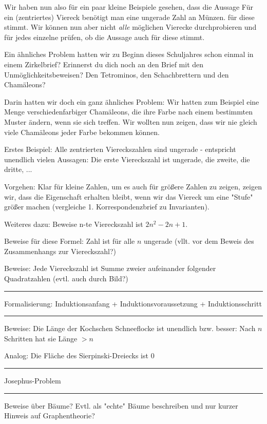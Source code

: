 \documentclass[a4paper,ngerman,12pt]{scrartcl}
\theoremstyle{definition}
\theoremstyle{plain}
\theoremstyle{remark}
\begin{document}
Wir haben nun also für ein paar kleine Beispiele gesehen, dass die Aussage \glqq Für ein (zentriertes) Viereck benötigt man eine ungerade Zahl an Münzen.\grqq{} für diese stimmt. Wir können nun aber nicht \emph{alle} möglichen Vierecke durchprobieren und für jedes einzelne prüfen, ob die Aussage auch für diese stimmt.

Ein ähnliches Problem hatten wir zu Beginn dieses Schuljahres schon einmal in einem Zirkelbrief? Erinnerst du dich noch an den Brief mit den Unmöglichkeitsbeweisen? Den Tetrominos, den Schachbrettern und den Chamäleons? 


Darin hatten wir doch ein ganz ähnliches Problem: Wir hatten zum Beispiel eine Menge verschiedenfarbiger Chamäleons, die ihre Farbe nach einem bestimmten Muster ändern, wenn sie sich treffen. Wir wollten nun zeigen, dass wir nie gleich viele Chamäleons jeder Farbe bekommen können.


Erstes Beispiel: Alle zentrierten Viereckszahlen sind ungerade - entspricht unendlich vielen Aussagen: Die erste Viereckszahl ist ungerade, die zweite, die dritte, ...

Vorgehen: Klar für kleine Zahlen, um es auch für größere Zahlen zu zeigen, zeigen wir, dass die Eigenschaft erhalten bleibt, wenn wir das Viereck um eine "Stufe" größer machen (vergleiche 1. Korrespondenzbrief zu Invarianten).

Weiteres dazu: Beweise n-te Viereckszahl ist $2n^2-2n+1$.

Beweise für diese Formel: Zahl ist für alle $n$ ungerade (vllt. vor dem Beweis des Zusammenhangs zur Viereckszahl?)

Beweise: Jede Viereckszahl ist Summe zweier aufeinander folgender Quadratzahlen (evtl. auch durch Bild?)

\hrule

Formalisierung: Induktionsanfang + Induktionsvoraussetzung + Induktionsschritt

\hrule

Beweise: Die Länge der Kochschen Schneeflocke ist unendlich bzw. besser: Nach $n$ Schritten hat sie Länge $> n$

Analog: Die Fläche des Sierpinski-Dreiecks ist $0$

\hrule

Josephus-Problem

\hrule

Beweise über Bäume? Evtl. als "echte" Bäume beschreiben und nur kurzer Hinweis auf Graphentheorie?
\end{document}
